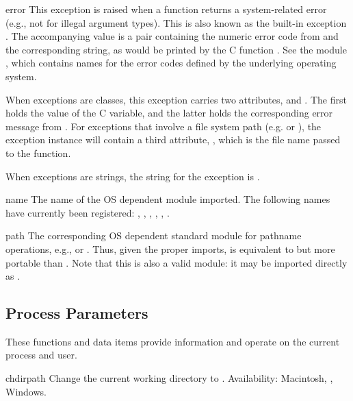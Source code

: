 \begin{excdesc}{error}
This exception is raised when a function returns a
system-related error (e.g., not for illegal argument types).  This is
also known as the built-in exception .  The
accompanying value is a pair containing the numeric error code from
 and the corresponding string, as would be printed by the
C function .  See the module
, which contains names for the
error codes defined by the underlying operating system.

When exceptions are classes, this exception carries two attributes,
 and .  The first holds the value of
the C  variable, and the latter holds the corresponding
error message from .  For exceptions that
involve a file system path (e.g.  or
), the exception instance will contain a third
attribute, , which is the file name passed to the
function.

When exceptions are strings, the string for the exception is
.
\end{excdesc}

\begin{datadesc}{name}
The name of the OS dependent module imported.  The following names
have currently been registered: , ,
, , , .
\end{datadesc}

\begin{datadesc}{path}
The corresponding OS dependent standard module for pathname
operations, e.g.,  or .  Thus, given
the proper imports,  is equivalent to but
more portable than .  Note that this 
is also a valid module: it may be imported directly as
.
\end{datadesc}



\subsection{Process Parameters \label{os-procinfo}}

These functions and data items provide information and operate on the
current process and user.

\begin{funcdesc}{chdir}{path}
Change the current working directory to .
Availability: Macintosh, \UNIX{}, Windows.
\end{funcdesc}

